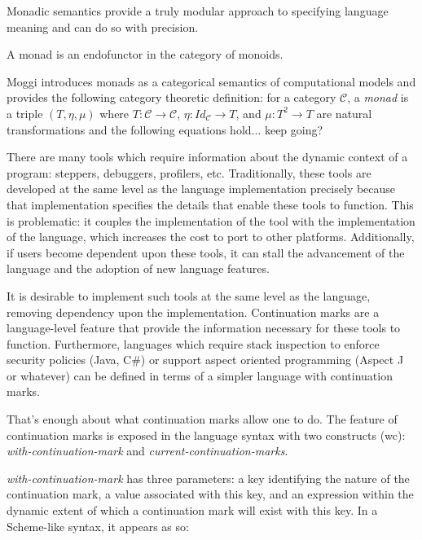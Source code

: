 \documentclass[ms]{byuprop}
\begin{document}
Monadic semantics provide a truly modular approach to specifying language meaning and can do so with precision.


A monad is an endofunctor in the category of monoids.

Moggi \cite{moggi1989computational} introduces monads as a categorical semantics of computational models and provides the following category theoretic definition: for a category $\mathcal{C}$, a \emph{monad} is a triple $(T,\eta,\mu)$ where $T:\mathcal{C}\rightarrow\mathcal{C}$, $\eta:Id_{\mathcal{C}}\rightarrow T$, and $\mu:T^{2}\rightarrow T$ are natural transformations and the following equations hold... keep going?


There are many tools which require information about the dynamic context of a program: steppers, debuggers, profilers, etc. Traditionally, these tools are developed at the same level as the language implementation precisely because that implementation specifies the details that enable these tools to function. This is problematic: it couples the implementation of the tool with the implementation of the language, which increases the cost to port to other platforms. Additionally, if users become dependent upon these tools, it can stall the advancement of the language and the adoption of new language features.

It is desirable to implement such tools at the same level as the 
language, removing dependency upon the implementation. Continuation marks are a language-level feature that provide the information necessary for these tools to function. Furthermore, languages which require stack inspection to enforce security policies (Java, C\#) or support aspect oriented programming (Aspect J or whatever) can be defined in terms of a simpler language with continuation marks.


That's enough about what continuation marks allow one to do. The feature of continuation marks is exposed in the language syntax with two constructs (wc): \emph{with-continuation-mark} and \emph{current-continuation-marks}.

\emph{with-continuation-mark} has three parameters: a key identifying the nature of the continuation mark, a value associated with this key, and an expression within the dynamic extent of which a continuation mark will exist with this key. In a Scheme-like syntax, it appears as so:
\end{document}
